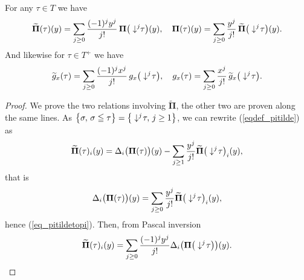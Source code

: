 \documentclass[11pt]{preprint}
\def\PPi{\boldsymbol{\Pi}}
\def\eqref#1{(\ref{#1})}
\begin{document}
	\begin{lemma}
		For any $\tau\in T$ we have 
		\begin{equation} \label{eq_pitildetopi}
			\widetilde{ \PPi}(\tau)(y) = \sum_{j\geq 0}\frac{(-1)^{j}y^j}{j!}\, { \PPi}\big(\downarrow^j\hspace{-3pt}\tau\big)(y), \quad 
			{ \PPi}(\tau)(y) = \sum_{j\geq 0}\frac{y^j}{j!} \, \widetilde{ \PPi}\big(\downarrow^j\hspace{-2pt}\tau\big)(y).
		\end{equation}
		And likewise for $\tau\in T^+$ we have 
		\begin{equation}\label{eq_defgtilde2}
			\widetilde{ g}_x(\tau) = \sum_{j\geq 0}\frac{(-1)^{j}x^j}{j!}\, { g}_x\big(\downarrow^j\hspace{-2pt}\tau\big),
\quad
			{ g}_x(\tau) = \sum_{j\geq 0}\frac{x^j}{j!} \, \widetilde{ g}_x\big(\downarrow^j\hspace{-2pt}\tau\big).
		\end{equation}
	\end{lemma}
	
	\begin{proof}
		We prove the two relations involving $\widetilde{\PPi}$, the other two are proven along the same lines.
		As 
	$	\big\{ \sigma, \, \sigma \leqq \tau \big\} = \big\{\downarrow^j\hspace{-2pt}\tau,\, j\geq 1 \big\}$,
		we can rewrite \eqref{eqdef_pitilde} as   
		$$
		\widetilde{\PPi}(\tau)_i(y) = \Delta_i\big( { \PPi}(\tau)\big)(y) - \sum_{j\geq 1} \frac{y^j}{j!}  \widetilde{ \PPi}\big( \downarrow^j\hspace{-2pt}\tau\big)_i(y),
		$$
		that is 
		$$
		\Delta_i\big( {\PPi}(\tau)\big)(y) = \sum_{j\geq 0} \frac{y^j}{j!}   \widetilde{ \PPi}\big(\downarrow^j\hspace{-2pt}\tau\big)_i(y),
		$$
		hence \eqref{eq_pitildetopi}. Then, from Pascal inversion
		\begin{equation}\label{eq_pitopitildei}
			\widetilde{ \PPi}(\tau)_i(y) = \sum_{j\geq 0} \frac{(-1)^jy^j}{j!}   \Delta_i \big({ \PPi}\big(\downarrow^j\hspace{-2pt}\tau\big)\big)(y).
		\end{equation}
	\end{proof}
	
\end{document}
